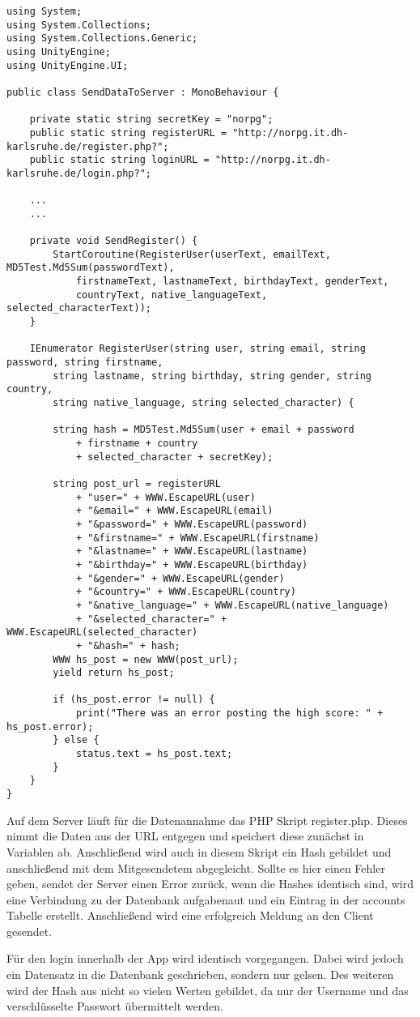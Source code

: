 \begin{scriptsize}
\lstset{
	float,
	caption=Skript SendDataToServer.cs, 
	language=[Sharp]C, 
	frame=single,  
	showstringspaces=false, 
	showspaces=false, 
	numbers=left, 
	captionpos=b, 
	belowcaptionskip=4pt,
	basicstyle=\ttfamily
} 
\begin{lstlisting}[label=lst:c_SendDataToServer]
using System;
using System.Collections;
using System.Collections.Generic;
using UnityEngine;
using UnityEngine.UI;

public class SendDataToServer : MonoBehaviour {

    private static string secretKey = "norpg";
    public static string registerURL = "http://norpg.it.dh-karlsruhe.de/register.php?";
    public static string loginURL = "http://norpg.it.dh-karlsruhe.de/login.php?";

	...
	...

    private void SendRegister() {
        StartCoroutine(RegisterUser(userText, emailText, MD5Test.Md5Sum(passwordText), 
        	firstnameText, lastnameText, birthdayText, genderText, 
        	countryText, native_languageText, selected_characterText));
    }

    IEnumerator RegisterUser(string user, string email, string password, string firstname, 
    	string lastname, string birthday, string gender, string country, 
    	string native_language, string selected_character) {

        string hash = MD5Test.Md5Sum(user + email + password 
        	+ firstname + country 
        	+ selected_character + secretKey);

        string post_url = registerURL
            + "user=" + WWW.EscapeURL(user)
            + "&email=" + WWW.EscapeURL(email)
            + "&password=" + WWW.EscapeURL(password)
            + "&firstname=" + WWW.EscapeURL(firstname)
            + "&lastname=" + WWW.EscapeURL(lastname)
            + "&birthday=" + WWW.EscapeURL(birthday)
            + "&gender=" + WWW.EscapeURL(gender)
            + "&country=" + WWW.EscapeURL(country)
            + "&native_language=" + WWW.EscapeURL(native_language)
            + "&selected_character=" + WWW.EscapeURL(selected_character)
            + "&hash=" + hash;
        WWW hs_post = new WWW(post_url);
        yield return hs_post;

        if (hs_post.error != null) {
            print("There was an error posting the high score: " + hs_post.error);
        } else {
            status.text = hs_post.text;
        }
    }
}

\end{lstlisting}
\end{scriptsize}
Auf dem Server läuft für die Datenannahme das PHP Skript register.php. Dieses nimmt die Daten aus der URL entgegen und speichert diese zunächst in Variablen ab. Anschließend wird auch in diesem Skript ein Hash gebildet und anschließend mit dem Mitgesendetem abgegleicht. Sollte es hier einen Fehler geben, sendet der Server einen Error zurück, wenn die Hashes identisch sind, wird eine Verbindung zu der Datenbank aufgabenaut und ein Eintrag in der accounts Tabelle erstellt. Anschließend wird eine erfolgreich Meldung an den Client gesendet.

Für den login innerhalb der App wird identisch vorgegangen. Dabei wird jedoch ein Datensatz in die Datenbank geschrieben, sondern nur gelsen. Des weiteren wird der Hash aus nicht so vielen Werten gebildet, da nur der Username und das verschlüsselte Passwort übermittelt werden.